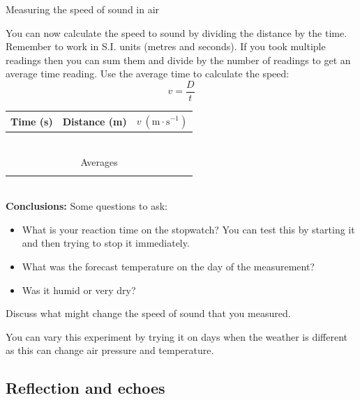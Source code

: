 \begin{i_experiment}{Measuring the speed of sound in air}
\begin{minipage}{.45\textwidth}
You can now calculate the speed to sound by dividing the distance by the time. Remember to work in S.I. units (metres and seconds). If you took multiple readings then you can sum them and divide by the number of readings to get an average time reading. Use the average time to calculate the speed:
\begin{equation*}
 v = \frac{D}{t}
\end{equation*} 
\end{minipage}\hspace{.03\textwidth}
\begin{minipage}{.5\textwidth}
\begin{table}[H]
 \begin{tabular}{|c|c|c|}\hline\hline
Time (s) & Distance (m) & $v~(\text{m}\cdot\text{s}^{-1})$ \\\hline
 & & \\\hline 
 & & \\\hline 
 & & \\\hline 
 & & \\\hline 
 & & \\\hline 
 & & \\\hline \hline
\multicolumn{3}{|c|}{Averages} \\ \hline
 & & \\\hline 
 \end{tabular}
\end{table}
\end{minipage}\\
\textbf{Conclusions:}
Some questions to ask:
\begin{itemize}
 \item What is your reaction time on the stopwatch? You can test this by starting it and then trying to stop it immediately.
 \item What was the forecast temperature on the day of the measurement?
 \item Was it humid or very dry?
\end{itemize}

Discuss what might change the speed of sound that you measured.

You can vary this experiment by trying it on days when the weather is different as this can change air pressure and temperature. \end{i_experiment}

\subsection{Reflection and echoes}

